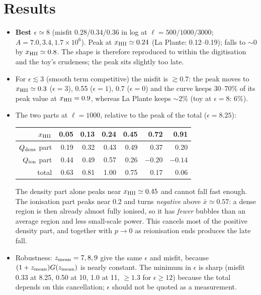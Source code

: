 \documentclass[10pt,a4paper]{article}
\newcommand{\xb}{\bar x}
\newcommand{\dens}{{\rm dens}}
\newcommand{\ion}{{\rm ion}}
\begin{document}
\section{Results}
\begin{itemize}\setlength\itemsep{1pt}
\item \textbf{Best $\epsilon\simeq8$} (misfit 0.28/0.34/0.36 in log at $\ell=500/1000/3000$; $A=7.0,3.4,1.7\times10^{6}$). Peak at $x_{\rm HII}\simeq0.24$ (La Plante: 0.12--0.19); falls to $\sim0$ by $x_{\rm HII}\simeq0.8$. The shape is therefore reproduced to within the digitisation and the toy's crudeness; the peak sits slightly too late.
\item For $\epsilon\lesssim3$ (smooth term competitive) the misfit is $\gtrsim0.7$: the peak moves to $x_{\rm HII}\simeq0.3$ ($\epsilon=3$), 0.55 ($\epsilon=1$), 0.7 ($\epsilon=0$) and the curve keeps 30--70\% of its peak value at $x_{\rm HII}=0.9$, whereas La Plante keeps $\sim2\%$ (toy at $\epsilon=8$: 6\%).
\item The two parts at $\ell=1000$, relative to the peak of the total ($\epsilon=8.25$):
\begin{center}\small\begin{tabular}{r|rrrrrr}\toprule
$x_{\rm HII}$ & 0.05 & 0.13 & 0.24 & 0.45 & 0.72 & 0.91\\\midrule
$Q_\dens$ part & 0.19 & 0.32 & 0.43 & 0.49 & 0.37 & 0.20\\
$Q_\ion$ part & 0.44 & 0.49 & 0.57 & 0.26 & $-0.20$ & $-0.14$\\
total & 0.63 & 0.81 & 1.00 & 0.75 & 0.17 & 0.06\\\bottomrule
\end{tabular}\end{center}
The density part alone peaks near $x_{\rm HII}\simeq0.45$ and cannot fall fast enough. The ionisation part peaks near 0.2 and turns \emph{negative} above $\xb\simeq0.57$: a dense region is then already almost fully ionised, so it has \emph{fewer} bubbles than an average region and less small-scale power. This cancels most of the positive density part, and together with $p\to0$ as reionisation ends produces the late fall.
\item Robustness: $z_{\rm mean}=7,8,9$ give the same $\epsilon$ and misfit, because $(1+z_{\rm mean})G(z_{\rm mean})$ is nearly constant. The minimum in $\epsilon$ is sharp (misfit 0.33 at 8.25, 0.50 at 10, 1.0 at 11, $\ge1.3$ for $\epsilon\ge12$) because the total depends on this cancellation; $\epsilon$ should not be quoted as a measurement.
\end{itemize}
\end{document}
